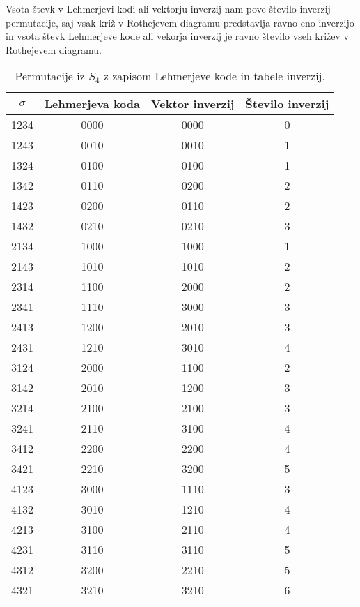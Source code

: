 \documentclass[a4paper, 12pt]{book}
\begin{document}
Vsota števk v Lehmerjevi kodi ali vektorju inverzij nam pove število inverzij permutacije, saj vsak križ v Rothejevem diagramu predstavlja ravno eno inverzijo in vsota števk Lehmerjeve kode ali vekorja inverzij je ravno število vseh križev v Rothejevem diagramu. 


\begin{table}[h]
    \begin{center}
        \begin{tabular}{ |c|c|c|c| } 
        \hline
            $\sigma$ & Lehmerjeva koda & Vektor inverzij & Število inverzij \\ 
        \hline
            1234 & 0000 & 0000 & 0 \\ 
        \hline
            1243 & 0010 & 0010 & 1 \\ 
        \hline
            1324 & 0100 & 0100 & 1 \\ 
        \hline
            1342 & 0110 & 0200 & 2 \\ 
        \hline
            1423 & 0200 & 0110 & 2 \\ 
        \hline
            1432 & 0210 & 0210 & 3 \\ 
        \hline
            2134 & 1000 & 1000 & 1 \\ 
        \hline
            2143 & 1010 & 1010 & 2 \\ 
        \hline
            2314 & 1100 & 2000 & 2 \\ 
        \hline
            2341 & 1110 & 3000 & 3 \\ 
        \hline
            2413 & 1200 & 2010 & 3 \\ 
        \hline
            2431 & 1210 & 3010 & 4 \\ 
        \hline
            3124 & 2000 & 1100 & 2 \\ 
        \hline
            3142 & 2010 & 1200 & 3 \\ 
        \hline
            3214 & 2100 & 2100 & 3 \\ 
        \hline
            3241 & 2110 & 3100 & 4 \\ 
        \hline
            3412 & 2200 & 2200 & 4 \\ 
        \hline
            3421 & 2210 & 3200 & 5 \\ 
        \hline
            4123 & 3000 & 1110 & 3 \\ 
        \hline
            4132 & 3010 & 1210 & 4 \\ 
        \hline
            4213 & 3100 & 2110 & 4 \\ 
        \hline
            4231 & 3110 & 3110 & 5 \\
        \hline
            4312 & 3200 & 2210 & 5 \\ 
        \hline
            4321 & 3210 & 3210 & 6 \\ 
        \hline
        \end{tabular}
    \end{center}
    \caption{ Permutacije iz $S_4$ z zapisom Lehmerjeve kode in tabele inverzij. }
    \label{tbl:permutacije4vektorji}
\end{table}
\end{document}
